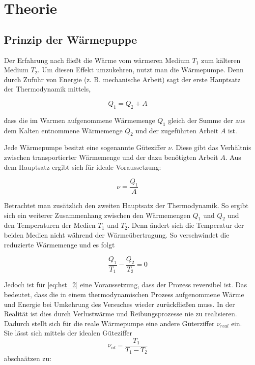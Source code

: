 \section{Theorie}

\subsection{Prinzip der Wärmepuppe}

Der Erfahrung nach fließt die Wärme
vom wärmeren Medium $T_1$ zum kälteren Medium $T_2$.
Um diesen Effekt umzukehren, nutzt man die Wärmepumpe.
Denn durch Zufuhr von Energie (z. B. mechanische Arbeit) sagt der erste 
Hauptsatz der Thermodynamik mittels,

\begin{equation}
\label{eq:hst_1}
Q_1=Q_2+A
\end{equation}

dass die im Warmen aufgenommene Wärmemenge $Q_1$ gleich 
der Summe der aus dem Kalten entnommene Wärmemenge $Q_2$
und der zugeführten Arbeit $A$ ist.

Jede Wärmepumpe besitzt eine sogenannte Güteziffer $\nu$.
Diese gibt das Verhältnis zwischen transportierter Wärmemenge 
und der dazu benötigten Arbeit $A$.
Aus dem Hauptsatz ergibt sich für ideale Voraussetzung:

\begin{equation}
\label{eq:best_kennziffer}
\nu=\frac{Q_1}{A}
\end{equation}

Betrachtet man zusätzlich den zweiten Hauptsatz der Thermodynamik.
So ergibt sich ein weiterer Zusammenhang zwischen den Wärmemengen 
$Q_1$ und $Q_2$ und den Temperaturen der Medien $T_1$ und $T_2$.
Denn ändert sich die Temperatur der beiden Medien nicht während der 
Wärmeübertragung. 
So verschwindet die reduzierte Wärmemenge und es folgt

\begin{equation}
\label{eq:hst_2}
\frac{Q_1}{T_1}-\frac{Q_2}{T_2}=0
\end{equation}

Jedoch ist für \eqref{eq:hst_2} eine Voraussetzung,
dass der Prozess reversibel ist.
Das bedeutet, dass die in einem thermodynamischen Prozess aufgenommene Wärme 
und Energie bei Umkehrung des Versuches wieder zurückfließen muss.
In der Realität ist dies durch Verlustwärme und Reibungsprozesse
nie zu realisieren.
Dadurch stellt sich für die reale Wärmepumpe eine andere 
Güterziffer $\nu_{real}$ ein. 
Sie lässt sich mittels der idealen Güteziffer 
\begin{equation*}
\nu_{id}=\frac{T_1}{T_1-T_2}
\end{equation*}
abschaätzen zu:

